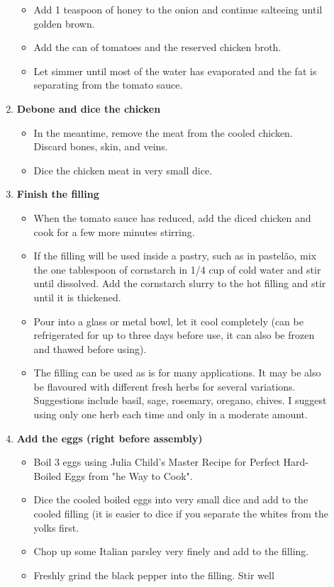 \documentclass[11pt,letterpaper]{article}
\newcommand \fileName {ChickenFilling}
\begin{document}
\begin{description}
\begin{enumerate}
\begin{itemize}
        \item Add 1 teaspoon of honey to the onion and continue salteeing until golden brown.
        \item Add the can of tomatoes and the reserved chicken broth.
        \item Let simmer until most of the water has evaporated and the fat is separating from the tomato sauce.
        \end{itemize}
        \item{\bf Debone and dice the chicken}
        \begin{itemize}
        \item In the meantime, remove the meat from the cooled chicken. Discard bones, skin, and veins.
        \item Dice the chicken meat in very small dice.
         \end{itemize}
        \item{\bf   Finish the filling}  
        \begin{itemize}
        \item When the tomato sauce has reduced, add the diced chicken and cook for a few more minutes stirring.
        \item If the filling will be used inside a pastry, such as in pastel\~ao, mix the one tablespoon of cornstarch in 1/4 cup of cold water and stir until dissolved. Add the cornstarch slurry to the hot filling and stir until it is thickened.
        \item Pour into a glass or metal bowl, let it cool completely (can be refrigerated for up to three days before use, it can also be frozen and thawed before using).
        \item The filling can be used as is for many applications. It may be also be flavoured with different fresh herbs for several variations. Suggestions include basil, sage, rosemary, oregano, chives. I suggest using only one herb each time and only in a moderate amount.
        \end{itemize}
        \item{\bf Add the eggs (right before assembly)}
	\begin{itemize}
	\item Boil 3 eggs using Julia Child's Master Recipe for Perfect Hard-Boiled Eggs from "he Way to Cook".
        \item Dice the cooled boiled eggs into very small dice and add to the cooled filling (it is easier to dice if you separate the whites from the yolks first.
        \item Chop up some Italian parsley very finely and add to the filling. 
        \item Freshly grind the black pepper into the filling. Stir well      
         \end{itemize}
	\end{enumerate}
\end{description}


\end{document}
